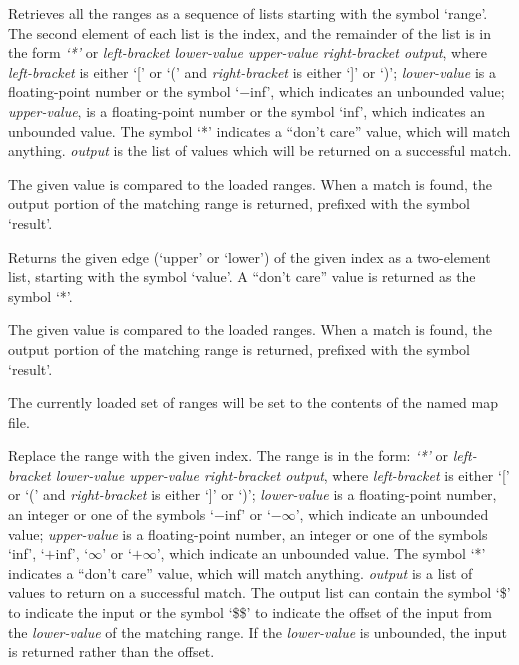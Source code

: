   Retrieves all the ranges as a sequence of lists starting with the symbol `range'.
  The second element of each list is the index, and the remainder of the list is in the form
  \emph{`*'} or \emph{left-bracket lower-value upper-value right-bracket output}, where \emph{left-bracket}
  is either `[' or `(' and \emph{right-bracket} is either `]' or `)';
  \emph{lower-value} is a floating-point number or the symbol `$-$inf',
  which indicates an unbounded value; \emph{upper-value}, is a floating-point number or
  the symbol `inf', which indicates an unbounded value.
  The symbol `*' indicates a ``don't care'' value, which will match anything.
  \emph{output} is the list of values which will be returned on a successful match.

  The given value is compared to the loaded ranges.
  When a match is found, the output portion of the matching range is returned, prefixed with the symbol
  `result'.
  
  Returns the given edge (`upper' or `lower') of the given index as a two-element list,
  starting with the symbol `value'.
  A ``don't care'' value is returned as the symbol `*'.

  The given value is compared to the loaded ranges.
  When a match is found, the output portion of the matching range is returned, prefixed with the symbol
  `result'.
  
  The currently loaded set of ranges will be set to the contents of the named map file.
 
  Replace the range with the given index.
  The range is in the form: \emph{`*'} or \emph{left-bracket lower-value upper-value right-bracket output}, where
  \emph{left-bracket} is either `[' or `(' and \emph{right-bracket} is either `]' or `)';
  \emph{lower-value} is a floating-point number, an integer or one of the symbols `$-$inf' or
  `$-\infty$', which indicate an unbounded value;
  \emph{upper-value} is a floating-point number, an integer or one of the symbols
  `inf', `$+$inf', `$\infty$' or `$+\infty$', which indicate an unbounded value.
  The symbol `*' indicates a ``don't care'' value, which will match anything.
  \emph{output} is a list of values to return on a successful match.
  The output list can contain the symbol `\$' to indicate the input or the symbol `\$\$' to
  indicate the offset of the input from the \emph{lower-value} of the matching range.
  If the \emph{lower-value} is unbounded, the input is returned rather than the offset.


